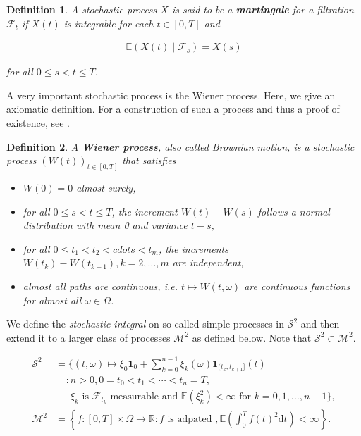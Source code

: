 \documentclass[a4paper]{article}
\newtheorem{definition}{Definition}[section]
\begin{document}
\begin{definition}
  A stochastic process $X$ is said to be a \textbf{martingale} for a filtration $\mathcal{F}_t$ if $X(t)$ is integrable for each $t \in [0,T]$ and

  \begin{align*}
    \mathbb{E}(X(t) \mid \mathcal{F}_s) = X(s)
  \end{align*}

  for all $0 \le s < t \le T$.
\end{definition}

A very important stochastic process is the Wiener process. Here, we give an axiomatic definition. For a construction of such a process and thus a proof of existence, see \textcite{capinski_stochastic_2012}.

\begin{definition}
  A \textbf{Wiener process}, also called Brownian motion, is a stochastic process $(W(t))_{t \in [0,T]}$ that satisfies

  \begin{itemize}
    \item $W(0) = 0$ almost surely,
    \item for all $0 \le s < t \le T$, the increment $W(t) - W(s)$ follows a normal distribution with mean 0 and variance $t - s$,
    \item for all $0 \le t_1 < t_2 < cdots < t_m$, the increments $W(t_k) - W(t_{k-1}), k=2,\ldots,m$ are independent,
    \item almost all paths are continuous, i.e. $t \mapsto W(t,\omega)$ are continuous functions for almost all $\omega \in \Omega$.
  \end{itemize}
\end{definition}

We define the \textit{stochastic integral} on so-called simple processes in $\mathcal{S}^2$ and then extend it to a larger class of processes $\mathcal{M}^2$ as defined below. Note that $\mathcal{S}^2 \subset \mathcal{M}^2$.

\begin{align*}
  \mathcal{S}^2 &= \{ (t,\omega) \mapsto \xi_0 \mathbf{1}_0 + \sum_{k=0}^{n-1} \xi_k(\omega) \mathbf{1}_{(t_k,t_{k+1}]}(t)\\
    &\ \ \ \ \ : n > 0, 0 = t_0 < t_1 < \cdots < t_n = T,\\
    &\ \ \ \ \ \ \ \xi_k \text{ is } \mathcal{F}_{t_k}\text{-measurable and } \mathbb{E}(\xi_k^2) < \infty \text{ for } k = 0,1,\ldots,n-1 \},\\
  \mathcal{M}^2 &= \left\{ f : [0,T] \times \Omega \to \mathbb{R} : f \text{ is adpated }, \mathbb{E}\left(\int_0^T f(t)^2 \mathrm{d}t \right) < \infty \right\}.
\end{align*}
\end{document}
